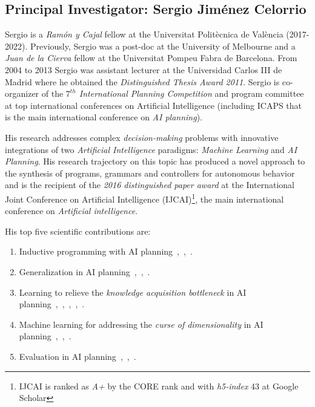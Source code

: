 \documentclass[10pt,a4paper]{paper}
\begin{document}
\subsection{Principal Investigator: Sergio Jiménez Celorrio}
Sergio is a {\em Ramón y Cajal} fellow at the Universitat Politècnica de València (2017-2022). Previously, Sergio was a post-doc at the University of Melbourne and a {\em Juan de la Cierva} fellow at the Universitat Pompeu Fabra de Barcelona. From 2004 to 2013 Sergio was assistant lecturer at the Universidad Carlos III de Madrid where he obtained the {\em Distinguished Thesis Award 2011}. Sergio is co-organizer of the {\em $7^{th}$ International Planning Competition} and program committee at top international conferences on Artificial Intelligence (including ICAPS that is the main international conference on {\em AI planning}).

His research addresses complex {\em decision-making} problems with innovative integrations of two {\em Artificial Intelligence} paradigms: {\em Machine Learning} and {\em AI Planning}. His research trajectory on this topic has produced a novel approach to the synthesis of programs, grammars and controllers for autonomous behavior and is the recipient of the {\it 2016 distinguished paper award} at the International Joint Conference on Artificial Intelligence (IJCAI)\footnote{IJCAI is ranked as {\it A+} by the CORE rank and with {\it h5-index} 43 at Google Scholar}, the main international conference on {\em Artificial intelligence}.

His top five scientific contributions are:
\begin{enumerate}
\item Inductive programming with AI planning{\footnotesize~\cite{javi-ijcai17},~\cite{segovia2016generalized},~\cite{jimenez2015computing}}.
\item Generalization in AI planning{\footnotesize~\cite{javi-icaps17},~\cite{damir-derived-ijcai16},~\cite{javi-fsc-ijcai16}}.
\item Learning to relieve the {\it knowledge acquisition bottleneck} in AI planning{\footnotesize{~\cite{diego-icaps18},~\cite{jimenez2013integrating},~\cite{jimenez2008architecture},~\cite{jimenez2006planning},~\cite{lanchas2007learning}}}.
\item Machine learning for addressing the {\it curse of dimensionality} in AI planning{\footnotesize~\cite{jimenez2012review},~\cite{de2011scaling},~\cite{de2008learning}}.  
\item Evaluation in AI planning{\footnotesize~\cite{lopez2015deterministic},~\cite{lopez2013automating},~\cite{coles2012survey}}. 
\end{enumerate}
\end{document}
